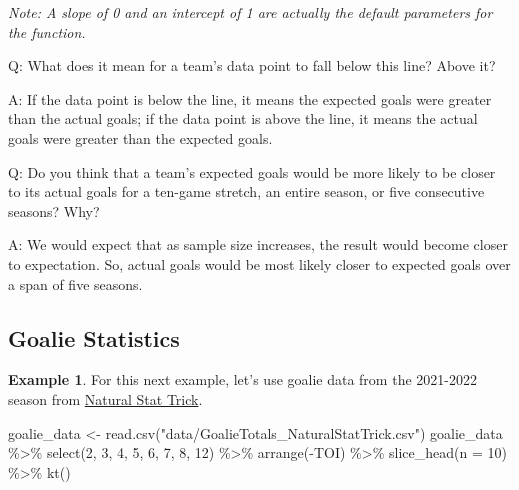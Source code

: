 \documentclass[
  11pt,
]{book}
\newenvironment{Shaded}{\begin{snugshade}}{\end{snugshade}}
\newcommand{\AttributeTok}[1]{\textcolor[rgb]{0.77,0.63,0.00}{#1}}
\newcommand{\DecValTok}[1]{\textcolor[rgb]{0.00,0.00,0.81}{#1}}
\newcommand{\FunctionTok}[1]{\textcolor[rgb]{0.00,0.00,0.00}{#1}}
\newcommand{\NormalTok}[1]{#1}
\newcommand{\OtherTok}[1]{\textcolor[rgb]{0.56,0.35,0.01}{#1}}
\newcommand{\SpecialCharTok}[1]{\textcolor[rgb]{0.00,0.00,0.00}{#1}}
\newcommand{\StringTok}[1]{\textcolor[rgb]{0.31,0.60,0.02}{#1}}
\theoremstyle{definition}
\theoremstyle{definition}
\newtheorem{example}{Example}[chapter]
\theoremstyle{definition}
\theoremstyle{definition}
\theoremstyle{remark}
\begin{document}
\emph{Note: A slope of 0 and an intercept of 1 are actually the default parameters for the function.}

Q: What does it mean for a team's data point to fall below this line? Above it?

A: If the data point is below the line, it means the expected goals were greater than the actual goals; if the data point is above the line, it means the actual goals were greater than the expected goals.

Q: Do you think that a team's expected goals would be more likely to be closer to its actual goals for a ten-game stretch, an entire season, or five consecutive seasons? Why?

A: We would expect that as sample size increases, the result would become closer to expectation. So, actual goals would be most likely closer to expected goals over a span of five seasons.

\hypertarget{goalie-statistics}{%
\subsection{Goalie Statistics}\label{goalie-statistics}}

\begin{example}
For this next example, let's use goalie data from the 2021-2022 season from \href{https://www.naturalstattrick.com/}{Natural Stat Trick}.
\end{example}

\begin{Shaded}
\begin{Highlighting}[]
\NormalTok{goalie\_data }\OtherTok{\textless{}{-}} \FunctionTok{read.csv}\NormalTok{(}\StringTok{"data/GoalieTotals\_NaturalStatTrick.csv"}\NormalTok{)}
\NormalTok{goalie\_data }\SpecialCharTok{\%\textgreater{}\%}
    \FunctionTok{select}\NormalTok{(}\DecValTok{2}\NormalTok{, }\DecValTok{3}\NormalTok{, }\DecValTok{4}\NormalTok{, }\DecValTok{5}\NormalTok{, }\DecValTok{6}\NormalTok{, }\DecValTok{7}\NormalTok{, }\DecValTok{8}\NormalTok{, }\DecValTok{12}\NormalTok{) }\SpecialCharTok{\%\textgreater{}\%}
    \FunctionTok{arrange}\NormalTok{(}\SpecialCharTok{{-}}\NormalTok{TOI) }\SpecialCharTok{\%\textgreater{}\%}
    \FunctionTok{slice\_head}\NormalTok{(}\AttributeTok{n =} \DecValTok{10}\NormalTok{) }\SpecialCharTok{\%\textgreater{}\%}
    \FunctionTok{kt}\NormalTok{()}
\end{Highlighting}
\end{Shaded}
\end{document}
